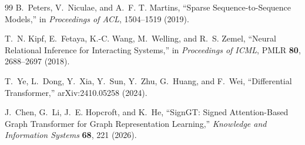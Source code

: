 \documentclass[10pt,twocolumn]{article}
\newcommand{\1}{\mathbf 1}
\theoremstyle{remark}
\begin{document}
\begin{thebibliography}{99}
B.~Peters, V.~Niculae, and A.~F. T. Martins, ``Sparse Sequence-to-Sequence Models,'' in
\emph{Proceedings of ACL}, 1504--1519 (2019).

T.~N. Kipf, E.~Fetaya, K.-C. Wang, M.~Welling, and R.~S. Zemel, ``Neural Relational Inference for
Interacting Systems,'' in \emph{Proceedings of ICML}, PMLR \textbf{80}, 2688--2697 (2018).

T.~Ye, L.~Dong, Y.~Xia, Y.~Sun, Y.~Zhu, G.~Huang, and F.~Wei, ``Differential Transformer,''
arXiv:2410.05258 (2024).

J.~Chen, G.~Li, J.~E. Hopcroft, and K.~He, ``SignGT: Signed Attention-Based Graph Transformer for
Graph Representation Learning,'' \emph{Knowledge and Information Systems} \textbf{68}, 221
(2026).

\end{thebibliography}
\end{document}
